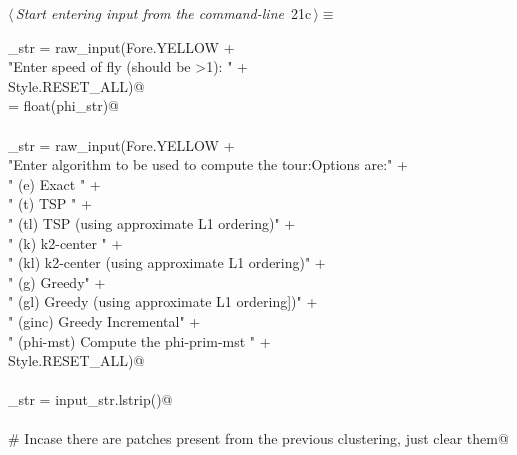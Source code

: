 \documentclass[11.5pt]{report}
\begin{document}
\vspace{-0.8cm}\newchunk 


\begin{flushleft} \small\label{scrap25}\raggedright\small
{} $\langle\,${\itshape Start entering input from the command-line}\nobreak\ {\footnotesize {21c}}$\,\rangle\equiv$
\vspace{-1ex}
\begin{list}{}{} \item
\mbox{}\verb@phi_str = raw_input(Fore.YELLOW + \@\\
\mbox{}\verb@          "Enter speed of fly (should be >1): " +\@\\
\mbox{}\verb@           Style.RESET_ALL)@\\
\mbox{}\verb@phi = float(phi_str)@\\
\mbox{}\verb@@\\
\mbox{}\verb@input_str = raw_input(Fore.YELLOW + \@\\
\mbox{}\verb@          "Enter algorithm to be used to compute the tour:\n Options are:\n" +\@\\
\mbox{}\verb@        "  (e)   Exact \n"                                   +\@\\
\mbox{}\verb@        "  (t)   TSP   \n"                                   +\@\\
\mbox{}\verb@        "  (tl)  TSP   (using approximate L1 ordering)\n"    +\@\\
\mbox{}\verb@        "  (k)   k2-center   \n"                             +\@\\
\mbox{}\verb@        "  (kl)  k2-center (using approximate L1 ordering)\n"  +\@\\
\mbox{}\verb@        "  (g)   Greedy\n"                                   +\@\\
\mbox{}\verb@        "  (gl)  Greedy (using approximate L1 ordering])\n"  +\@\\
\mbox{}\verb@        "  (ginc) Greedy Incremental\n"  +\@\\
\mbox{}\verb@        "  (phi-mst) Compute the phi-prim-mst "               +\@\\
\mbox{}\verb@        Style.RESET_ALL)@\\
\mbox{}\verb@@\\
\mbox{}\verb@input_str = input_str.lstrip()@\\
\mbox{}\verb@@\\
\mbox{}\verb@# Incase there are patches present from the previous clustering, just clear them@\\

\end{list}
\end{flushleft}
\end{document}
